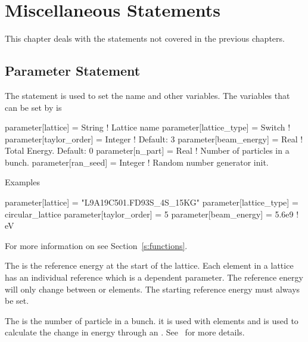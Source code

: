 \chapter{Miscellaneous Statements}

This chapter deals with the statements not covered in the previous chapters.

\section{Parameter Statement}
\label{s:param}


The  statement is used to set the  name and other variables. 
The variables that can be set by  is
\begin{example}
  parameter[lattice]      = String      ! Lattice name 
  parameter[lattice_type] = Switch      ! 
  parameter[taylor_order] = Integer     ! Default: 3
  parameter[beam_energy]  = Real        ! Total Energy. Default: 0
  parameter[n_part]       = Real        ! Number of particles in a bunch.
  parameter[ran_seed]     = Integer     ! Random number generator init.
\end{example}

\noindent
Examples
\begin{example}
  parameter[lattice]      = "L9A19C501.FD93S_4S_15KG"
  parameter[lattice_type] = circular_lattice
  parameter[taylor_order] = 5
  parameter[beam_energy]  = 5.6e9    ! eV
\end{example}

For more information on  see Section~\ref{s:functions}.

The  is the reference energy at the start of the
lattice.  Each element in a lattice has an individual reference
 which is a dependent parameter. 
The reference energy will only change between  or
 elements. The starting reference energy must always be set.

The  is the number of particle in a bunch.
it is used with  elements and is used to calculate the
change in energy through an . See~ for more
details.

